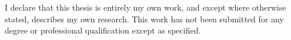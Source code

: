 


\noindent I declare that this thesis is entirely my own work, and except where otherwise stated, describes my own research. This work has not been submitted for any degree or professional qualification except as specified.